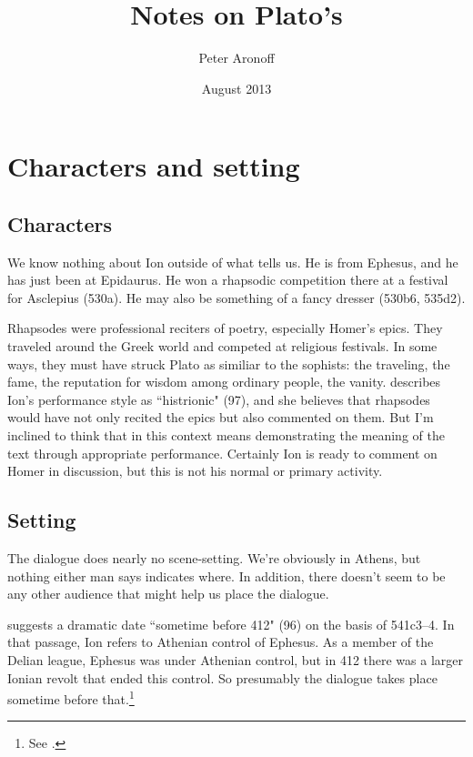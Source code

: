 \documentclass[11pt]{article}
\begin{document}
\begin{titlepage}
\title{Notes on Plato's }
\author{Peter Aronoff}
\date{August 2013}
\maketitle
\thispagestyle{empty}
\end{titlepage}

\section{Characters and setting}

\subsection{Characters}

We know nothing about Ion outside of what  tells us.  He is from
Ephesus, and he has just been at Epidaurus.  He won a rhapsodic competition
there at a festival for Asclepius (530a).  He may also be something of
a fancy dresser (530b6, 535d2).

Rhapsodes were professional reciters of poetry, especially Homer's epics.
They traveled around the Greek world and competed at religious festivals.
In some ways, they must have struck Plato as similiar to the sophists: the
traveling, the fame, the reputation for wisdom among ordinary people, the
vanity.  \citet{murray1996} describes Ion's performance style as
``histrionic" (97), and she believes that rhapsodes would have not only
recited the epics but also commented on them.  But I'm inclined to think
that in this context  means demonstrating the meaning
of the text through appropriate performance. Certainly Ion is ready to
comment on Homer in discussion, but this is not his normal or primary
activity.


\subsection{Setting}

The dialogue does nearly no scene-setting.  We're obviously in Athens, but
nothing either man says indicates where.  In addition, there doesn't seem
to be any other audience that might help us place the dialogue.

\citet{murray1996} suggests a dramatic date ``sometime before 412" (96) on
the basis of 541c3--4.  In that passage, Ion refers to Athenian control of
Ephesus.  As a member of the Delian league, Ephesus was under Athenian
control, but in 412 there was a larger Ionian revolt that ended this
control.  So presumably the dialogue takes place sometime before
that.\footnote{See \citet{moore1974}.}
\end{document}
